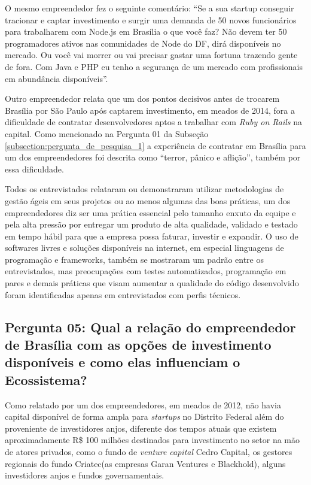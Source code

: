 O mesmo empreendedor fez o seguinte comentário: ``Se a sua startup conseguir tracionar e captar investimento e surgir uma demanda de 50 novos funcionários para trabalharem com Node.js em Brasília o que você faz? Não devem ter 50 programadores ativos nas comunidades de Node do DF, dirá disponíveis no mercado. Ou você vai morrer ou vai precisar gastar uma fortuna trazendo gente de fora. Com Java e PHP eu tenho a segurança de um mercado com profissionais em abundância disponíveis''.

Outro empreendedor relata que um dos pontos decisivos antes de trocarem Brasília por São Paulo após captarem investimento, em meados de 2014, fora a dificuldade de contratar desenvolvedores aptos a trabalhar com \textit{Ruby on Rails} na capital. Como mencionado na Pergunta 01 da Subseção \ref{subsection:pergunta_de_pesquisa_1} a experiência de contratar em Brasília para um dos empreendedores foi descrita como ``terror, pânico e aflição'', também por essa dificuldade.

Todos os entrevistados relataram ou demonstraram utilizar metodologias de gestão ágeis em seus projetos ou ao menos algumas das boas práticas, um dos empreendedores diz ser uma prática essencial pelo tamanho enxuto da equipe e pela alta pressão por entregar um produto de alta qualidade, validado e testado em tempo hábil para que a empresa possa faturar, investir e expandir. O uso de softwares livres e soluções disponíveis na internet, em especial linguagens de programação e frameworks, também se mostraram um padrão entre os entrevistados, mas preocupações com testes automatizados, programação em pares e demais práticas que visam aumentar a qualidade do código desenvolvido foram identificadas apenas em entrevistados com perfis técnicos.

\subsection*{Pergunta 05: Qual a relação do empreendedor de Brasília com as opções de investimento disponíveis e como elas influenciam o Ecossistema?}
\label{subsection:pergunta_de_pesquisa_5}

Como relatado por um dos empreendedores, em meados de 2012, não havia capital disponível de forma ampla para \textit{startups} no Distrito Federal além do proveniente de investidores anjos, diferente dos tempos atuais que existem aproximadamente R\$ 100 milhões destinados para investimento no setor na mão de atores privados, como o fundo de \textit{venture capital} Cedro Capital, os gestores regionais do fundo Criatec(as empresas Garan Ventures e Blackhold), alguns investidores anjos e fundos governamentais. 

